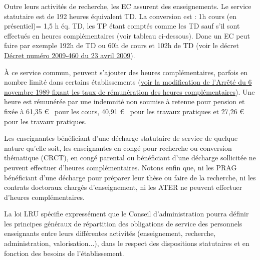 Outre leurs activit\'es de recherche, les EC assurent des enseignements. Le service statutaire est de 192 heures \og \'equivalent TD\fg{}. 
La conversion est : 1h cours (en pr\'esentiel)= 1,5 h \'eq. TD, les TP \'etant compt\'es comme les TD sauf s'il sont effectu\'es en heures compl\'ementaires (voir tableau ci-dessous). Donc un EC peut faire par exemple 192h de TD ou 60h de cours et 102h de TD 
(voir le d\'ecret \href{http://www.legifrance.gouv.fr/affichTexte.do?cidTexte=JORFTEXT000020552216&dateTexte=&categorieLien=id}{D\'ecret num\'ero 2009-460 du 23 avril 2009}).


\`A ce service commun, peuvent s'ajouter des heures
compl\'ementaires, parfois en nombre limit\'e dans certains \'etablissements (\href{http://www.legifrance.gouv.fr/affichTexte.do?cidTexte=JORFTEXT000000315917&dateTexte=20121122}{voir la modification de l'Arr\^et\'e du 6 novembre 1989 fixant les taux de r\'emun\'eration des heures compl\'ementaires}). Une heure est r\'emun\'er\'ee par une indemnit\'e non soumise \`a retenue pour pension et fix\'ee \`a 61,35 \euro~ pour les cours, 40,91 \euro~ pour les travaux pratiques et 27,26 \euro~ pour les travaux pratiques.


Les enseignant\mp e\mp s b\'en\'eficiant d'une d\'echarge statutaire de service de quelque
nature qu'elle soit, les enseignant\mp e\mp s en cong\'e pour recherche ou
conversion th\'ematique (CRCT), en cong\'e parental ou b\'en\'eficiant d'une
d\'echarge sollicit\'ee ne peuvent effectuer d'heures
compl\'ementaires. Notons enfin
que, ni les PRAG b\'en\'eficiant d'une d\'echarge pour
pr\'eparer leur th\`ese ou faire de la recherche,
ni les contrats doctoraux charg\'es d'enseignement,
ni les ATER ne peuvent effectuer d'heures compl\'ementaires.

La loi LRU sp\'ecifie express\'ement que le Conseil
d'administration pourra d\'efinir les principes g\'en\'eraux de
r\'epartition des obligations de service des personnels enseignants
entre leurs diff\'erentes activit\'es (enseignement, recherche,
administration, valorisation...), dans le respect des dispositions
statutaires et en fonction des besoins de l'\'etablissement.

